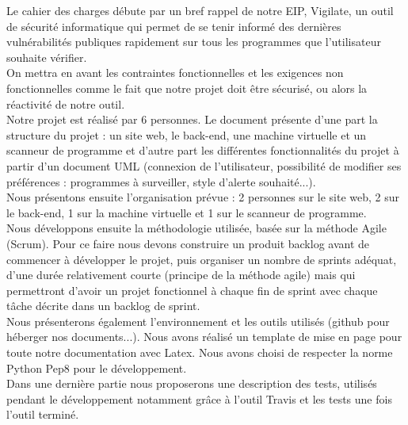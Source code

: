 Le cahier des charges débute par un bref rappel de notre EIP, Vigilate, un outil de sécurité informatique qui permet de se tenir informé des dernières vulnérabilités publiques rapidement sur tous les programmes que l’utilisateur souhaite vérifier.\\
On mettra en avant les contraintes fonctionnelles et les exigences non fonctionnelles comme le fait que notre projet doit être sécurisé, ou alors la réactivité de notre outil.\\
Notre projet est réalisé par 6 personnes. Le document présente d’une part la structure du projet : un site web, le back-end, une machine virtuelle et un scanneur de programme et d’autre part les différentes fonctionnalités du projet à partir d’un document UML (connexion de l’utilisateur, possibilité de modifier ses préférences : programmes à surveiller, style d’alerte souhaité...).\\
Nous présentons ensuite l’organisation prévue : 2 personnes sur le site web, 2 sur le back-end, 1 sur la machine virtuelle et 1 sur le scanneur de programme.\\
Nous développons ensuite la méthodologie utilisée, basée sur la méthode Agile (Scrum). Pour ce faire nous devons construire un produit backlog avant de commencer à développer le projet, puis organiser un nombre de sprints adéquat, d’une durée relativement courte (principe de la méthode agile) mais qui permettront d’avoir un projet fonctionnel à chaque fin de sprint avec chaque tâche décrite dans un backlog de sprint.\\
Nous présenterons également l’environnement et les outils utilisés (github pour  héberger nos documents...). Nous avons réalisé un template de mise en page pour toute notre documentation avec Latex. Nous avons choisi de respecter la norme Python Pep8 pour le développement.\\
Dans une dernière partie nous proposerons une description des tests, utilisés pendant le développement notamment grâce à l’outil Travis et les tests une fois l’outil terminé.\\